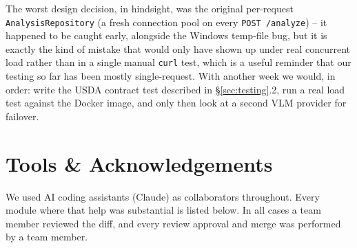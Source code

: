 \documentclass[11pt,a4paper]{article}
\begin{document}
The worst design decision, in hindsight, was the original per-request \texttt{AnalysisRepository} (a fresh connection pool on every \texttt{POST /analyze}) -- it happened to be caught early, alongside the Windows temp-file bug, but it is exactly the kind of mistake that would only have shown up under real concurrent load rather than in a single manual \texttt{curl} test, which is a useful reminder that our testing so far has been mostly single-request. With another week we would, in order: write the USDA contract test described in \S\ref{sec:testing}.2, run a real load test against the Docker image, and only then look at a second VLM provider for failover.

\section{Tools \& Acknowledgements}\label{sec:tools}

We used AI coding assistants (Claude) as collaborators throughout. Every module where that help was substantial is listed below. In all cases a team member reviewed the diff, and every review approval and merge was performed by a team member.
\end{document}
